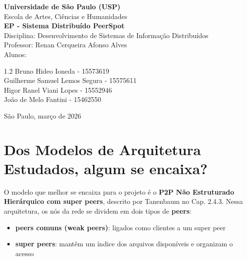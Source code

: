 \documentclass[12pt, a4paper]{article}
\begin{document}
\begin{titlepage}
  \centering
  {\LARGE \textbf{Universidade de São Paulo (USP)}}\\
  Escola de Artes, Ciências e Humanidades\\
  \vspace{2cm}
  {\Huge \textbf{EP - Sistema Distribuído PeerSpot}\\}
  \vspace{1.5cm}
  {\Large Disciplina: Desenvolvimento de Sistemas de Informação Distribuídos}\\
  Professor: Renan Cerqueira Afonso Alves\\
  \vspace{1.5cm}
  {\Large Alunos:}\\
  \begin{spacing}{1.2}
    Bruno Hideo Ioneda - 15573619\\
    Guilherme Samuel Lemos Segura - 15575611\\
    Higor Ranel Viani Lopes - 15552946\\
    João de Melo Fantini - 15462550\\
  \end{spacing}
  \vfill
  {\Large São Paulo, março de 2026}
\end{titlepage}

\newpage
\tableofcontents
\newpage


\section{Dos Modelos de Arquitetura Estudados, algum se encaixa?}\label{sec:modelos}

O modelo que melhor se encaixa para o projeto é o \textbf{P2P Não Estruturado Hierárquico com super peers}, descrito por Tanenbaum no Cap. 2.4.3. Nessa arquitetura, os nós da rede se dividem em dois tipos de \textbf{peers}:
\begin{itemize}
    \item \textbf{peers comuns (weak peers)}: ligados como clientes a um super peer
    \item \textbf{super peers}: mantêm um índice dos arquivos disponíveis e organizam o acesso
\end{itemize}
\end{document}
